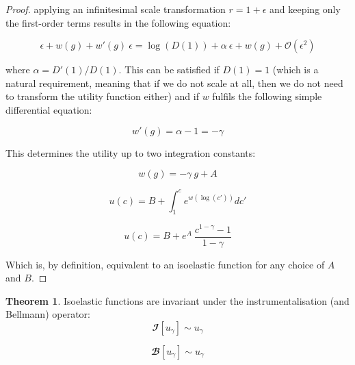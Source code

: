 \documentclass{article}
\theoremstyle{definition}
\newtheorem{theorem}{Theorem}[section]
\begin{document}
\begin{proof}
    applying an infinitesimal scale transformation $r=1+\epsilon$ and keeping only the first-order terms results in the following equation:

    \begin{equation}
        \epsilon + w(g) + w'(g) \ \epsilon = \log(D(1)) + \alpha \ \epsilon + w(g) + \mathcal{O}(\epsilon^2)
    \end{equation}

    where $\alpha = D'(1)/D(1)$.
    This can be satisfied if $D(1) = 1$ (which is a natural requirement, meaning that if we do not scale at all, then we do not need to transform the utility function either) and if $w$ fulfils the following simple differential equation:

    \begin{equation}
        w'(g) = \alpha - 1 = - \gamma 
    \end{equation}

    This determines the utility up to two integration constants:

    \begin{equation}
        w(g) = - \gamma \ g + A
    \end{equation}

    \begin{equation}
        u(c) = B + \int_{1}^{c} e^{w(\log(c'))} dc'
    \end{equation}

    \begin{equation}
        u(c) = B + e^A \ \frac{c^{1- \gamma} - 1}{1- \gamma}
    \end{equation}

    Which is, by definition, equivalent to an isoelastic function for any choice of $A$ and $B$.
    
\end{proof}


\begin{theorem}
    Isoelastic functions are invariant under the instrumentalisation (and Bellmann) operator:
    \begin{equation}
        \mathbfcal{I}[u_\gamma] \sim u_\gamma
    \end{equation}

    \begin{equation}
        \mathbfcal{B}[u_\gamma] \sim u_\gamma
    \end{equation}
\end{theorem}
\end{document}
